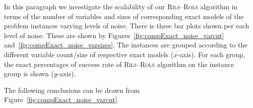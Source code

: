 \documentclass[a4paper,12pt]{elsarticle}
\begin{document}
\begin{center}
	\label{fig:compR2_noise_size}
\end{center}

In this paragraph we investigate the  scalability of our \textsc{Rils}--\textsc{Rols} algorithm in terms of the number of variables and sizes of corresponding exact models of the problem instances varying levels of noise. There is three bar plots shown per each level of noise.  These are shown by Figures~\ref{fig:compExact_noise_varcnt} and~\ref{fig:compExact_noise_varsizes}. The instances are grouped according to the different variable count/size of respective exact models ($x$-axis). For each group, the exact percentages of success rate of \textsc{Rils}--\textsc{Rols} algorithm on the instance group is shown ($y$-axis).

The following conclusions can be drawn from Figure~\ref{fig:compExact_noise_varcnt}. 
\end{document}

